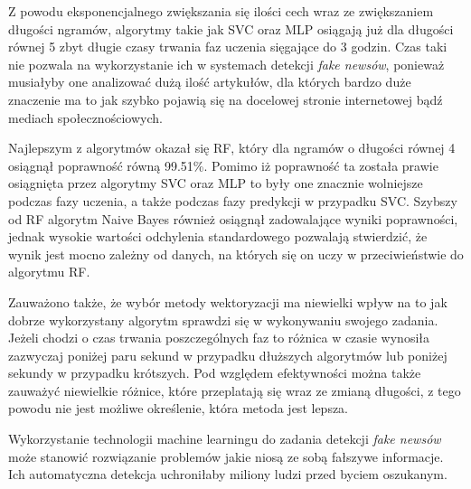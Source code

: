 Z powodu eksponencjalnego zwiększania się ilości cech wraz ze zwiększaniem długości ngramów, 
algorytmy takie jak SVC oraz MLP osiągają już dla długości równej 5 zbyt długie czasy trwania faz uczenia sięgające 
do 3 godzin. Czas taki nie pozwala na wykorzystanie ich w systemach detekcji \textit{fake newsów}, ponieważ
musiałyby one analizować dużą ilość artykułów, dla których bardzo duże znaczenie ma to jak 
szybko pojawią się na docelowej stronie internetowej bądź mediach społecznościowych.

Najlepszym z algorytmów okazał się RF, który dla ngramów o długości równej 4
osiągnął poprawność równą 99.51\%. Pomimo iż poprawność ta została prawie osiągnięta przez algorytmy
SVC oraz MLP to były one znacznie wolniejsze podczas fazy uczenia, a także podczas fazy 
predykcji w przypadku SVC. Szybszy od RF algorytm Naive Bayes również osiągnął zadowalające wyniki poprawności,
jednak wysokie wartości odchylenia standardowego pozwalają stwierdzić, że wynik jest mocno zależny od 
danych, na których się on uczy w przeciwieństwie do algorytmu RF.

Zauważono także, że wybór metody wektoryzacji ma niewielki wpływ na to jak dobrze wykorzystany algorytm 
sprawdzi się w wykonywaniu swojego zadania. Jeżeli chodzi o czas trwania poszczególnych faz to 
różnica w czasie wynosiła zazwyczaj poniżej paru sekund w przypadku dłuższych algorytmów lub poniżej 
sekundy w przypadku krótszych. Pod względem efektywności można także zauważyć niewielkie różnice,
które przeplatają się
wraz ze zmianą długości, z tego powodu nie jest możliwe określenie, która metoda jest lepsza.

Wykorzystanie technologii machine learningu do zadania detekcji \textit{fake newsów} 
może stanowić rozwiązanie problemów jakie niosą ze sobą fałszywe informacje. Ich automatyczna 
detekcja uchroniłaby miliony ludzi przed byciem oszukanym. 
